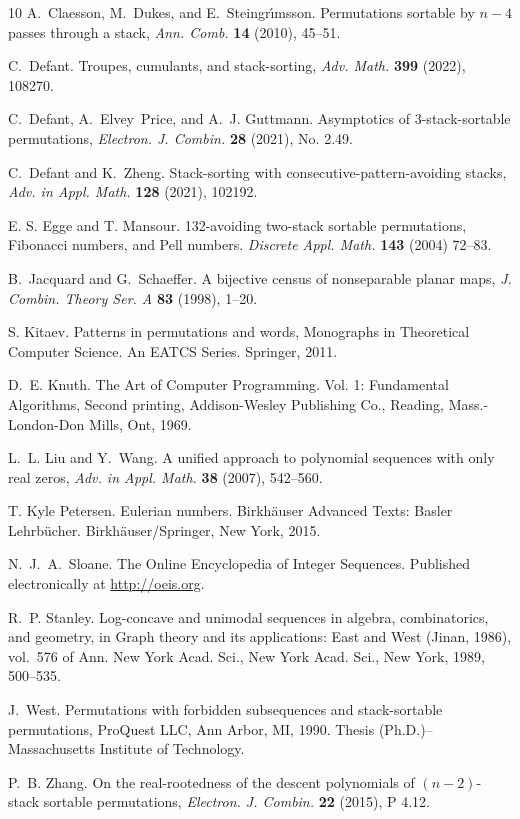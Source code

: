 \documentclass[11pt]{article}
\newcommand{\+}{\mbox{\ensuremath{\scriptstyle{+}}}}
\begin{document}
\begin{thebibliography}{10}
	A.~Claesson, M.~Dukes, and E.~Steingr{\'{\i}}msson. Permutations sortable by
		{$n-4$} passes through a stack, {\em Ann. Comb.} {\bf 14} (2010), 45--51.


	C.~Defant. Troupes, cumulants, and stack-sorting, {\em Adv. Math.} {\bf 399} (2022), 108270.

	C.~Defant, A.~Elvey~Price, and A.~J. Guttmann. Asymptotics of 3-stack-sortable permutations, {\em Electron. J. Combin.} {\bf 28} (2021), No. 2.49.

	C.~Defant and K.~Zheng. Stack-sorting with consecutive-pattern-avoiding stacks,
	{\em Adv. in Appl. Math.} {\bf 128} (2021), 102192.

	 E. S. Egge and T. Mansour. 132-avoiding two-stack sortable permutations, Fibonacci numbers, and Pell numbers. {\em Discrete Appl. Math.} {\bf 143} (2004) 72--83.

	B.~Jacquard and G.~Schaeffer. A bijective census of nonseparable planar maps,
	{\em J. Combin. Theory Ser. A} {\bf 83} (1998), 1--20.

	S. Kitaev. Patterns in permutations and words, Monographs in Theoretical Computer Science. An EATCS Series. Springer,  2011.

	D.~E. Knuth. The {A}rt of {C}omputer {P}rogramming. {V}ol. 1: {F}undamental
	{A}lgorithms, Second printing, Addison-Wesley Publishing Co., Reading,
	Mass.-London-Don Mills, Ont, 1969.

	L.~L. Liu and Y.~Wang. A unified approach to polynomial sequences with only
	real zeros, {\em Adv. in Appl. Math.} {\bf 38} (2007), 542--560.

	T. Kyle Petersen.
	Eulerian numbers. Birkh\"{a}user Advanced Texts: Basler Lehrb\"{u}cher.  Birkh\"{a}user/Springer, New York, 2015.


	 N.~J.~A.~Sloane. The Online Encyclopedia of Integer Sequences. Published electronically at \url{http://oeis.org}.

	R.~P. Stanley. Log-concave and unimodal sequences in algebra, combinatorics,
	and geometry, in Graph theory and its applications: {E}ast and {W}est
	({J}inan, 1986), vol.~576 of Ann. New York Acad. Sci., New York Acad. Sci.,
	New York, 1989, 500--535.


	J.~West. Permutations with forbidden subsequences and stack-sortable
	permutations, ProQuest LLC, Ann Arbor, MI, 1990.
	\newblock Thesis (Ph.D.)--Massachusetts Institute of Technology.

	P.~B. Zhang. On the real-rootedness of the descent polynomials of
		{$(n-2)$}-stack sortable permutations, {\em Electron. J. Combin.} {\bf 22} (2015), P 4.12.

\end{thebibliography}
\end{document}

